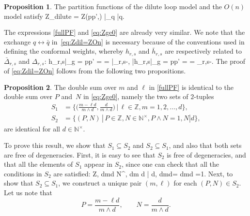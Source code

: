 \documentclass[11pt]{article}
\numberwithin{equation}{section}
\theoremstyle{definition}
\newtheorem{Proposition}{Proposition}[section]
\numberwithin{equation}{section}
\begin{document}
\begin{Proposition}
The partition functions of the dilute loop model and the $O(n)$ model satisfy
\be
\label{eq:Zdil=ZOn}
\mathcal Z_{\textrm{dilute}} = \hat Z(\tfrac p{p'},\tfrac{\gamma}\pi) \Big|_{q \leftrightarrow \bar q}.
\ee
\end{Proposition}
\noindent The expressions \eqref{fullPF} and \eqref{eq:Zge0} are already very similar. We note that the exchange $q \leftrightarrow \bar q$ in~\eqref{eq:Zdil=ZOn} is necessary because of the conventions used in defining the conformal weights, whereby $h_{r,s}$ and $\bar h_{r,s}$ are respectively related to $\bar\Delta_{r,s}$ and $\Delta_{r,s}$:
\be
h_{r,s}\big|_{g = \frac p{p'}} =  = \bar\Delta_{r,s}-, \qquad 
\bar h_{r,s}\big|_{g = \frac p{p'}} =  = \Delta_{r,s}-.
\ee
 The proof of \eqref{eq:Zdil=ZOn} follows from the following two propositions.
\begin{Proposition}
The double sum over $m$ and $\ell$ in \eqref{fullPF} is identical to the double sum over $P$ and~$N$ in \eqref{eq:Zge0}, namely the two sets of $2$-tuples
\begin{subequations}
\begin{alignat}{2}
S_1 &= \bigg\{ \bigg(\frac{m-\ell d}{m\wedge d}, \frac d{m\wedge d}\bigg) \,\Big| \,\ell \in \mathbb Z, m = 1, 2, \dots, d\bigg\},
\\[0.15cm]
S_2 &= \big\{ ( P,N)\,|\,P \in \mathbb Z, N \in \mathbb N^\times, P\wedge N = 1, N | d \big\},
\end{alignat}
\end{subequations}
are identical for all $d \in \mathbb N^\times$. 
\end{Proposition}
\proof
To prove this result, we show that $S_1 \subseteq S_2$ and $S_2 \subseteq S_1$, and also that both sets are free of degeneracies. First, it is easy to see that $S_2$ is free of degeneracies, and that all the elements of $S_1$ appear in
$S_2$, since one can check that all the conditions in $S_2$ are satisfied: 
\be
{} \in \mathbb Z, 
\qquad 
\frac d{m\wedge d} \in \mathbb N^\times, 
\qquad 
\frac d{m \wedge d} \Big| d,
\qquad
{} \wedge  \frac d{m\wedge d}=
 \wedge \frac d{m\wedge d} =1.
\ee
Next, to show that $S_2 \subseteq S_1$, we construct a unique pair $(m,\ell)$ for each $(P,N) \in S_2$. Let us note that 
\begin{equation}
\label{eq:mapS1S2}
P=\frac{m-\ell d}{m\wedge d}, \qquad N=\frac d{m\wedge d}.
\end{equation}
\end{document}
